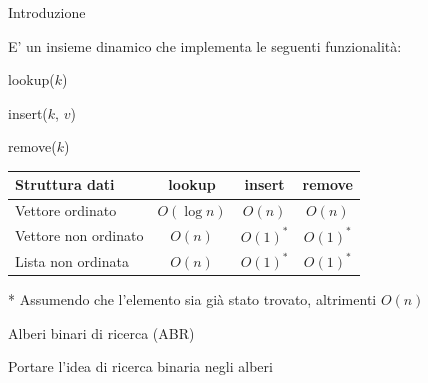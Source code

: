 \begin{frame}{Introduzione}

\vspace{-9pt}
\begin{myboxtitle}[Dizionario]
E' un insieme dinamico che implementa le seguenti funzionalità:
\BIL
\item \Item \textsf{lookup}(\Item $k$)
\item \textsf{insert}(\Item $k$, \Item $v$)
\item \textsf{remove}(\Item $k$)
\EIL
\end{myboxtitle}

\begin{myboxtitle}

\begin{tabular}{|l|c|c|c|}
\hline
Struttura dati & \textsf{lookup} & \textsf{insert} & \textsf{remove} \\\hline
Vettore ordinato &  $O(\log n)$ & $O(n)$ & $O(n)$ \\\hline
Vettore non ordinato &  $O(n)$ & $O(1)^*$ & $O(1)^*$ \\\hline
Lista non ordinata &  $O(n)$ & $O(1)^*$ & $O(1)^*$ \\\hline
\end{tabular}

\footnotesize
* Assumendo che l'elemento sia già stato trovato, altrimenti $O(n)$
\end{myboxtitle}

\end{frame}


\begin{frame}{Alberi binari di ricerca (ABR)}


\vspace{-9pt}
\begin{myboxtitle}
Portare l'idea di ricerca binaria negli alberi
\end{myboxtitle}

\end{frame}


